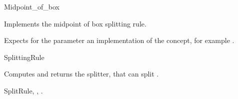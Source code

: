 

\begin{ccRefFunctionObjectClass}{Midpoint_of_box}  %


\ccDefinition
Implements the midpoint of box splitting rule.


\ccParameters

Expects for the parameter  an implementation of the
 concept, for example .

\ccIsModel

SplittingRule

\ccTypes


\ccCreation
{}  %



{Computes and returns the splitter, that can split .}

\ccSeeAlso

SplitRule,
,
.

\end{ccRefFunctionObjectClass}



